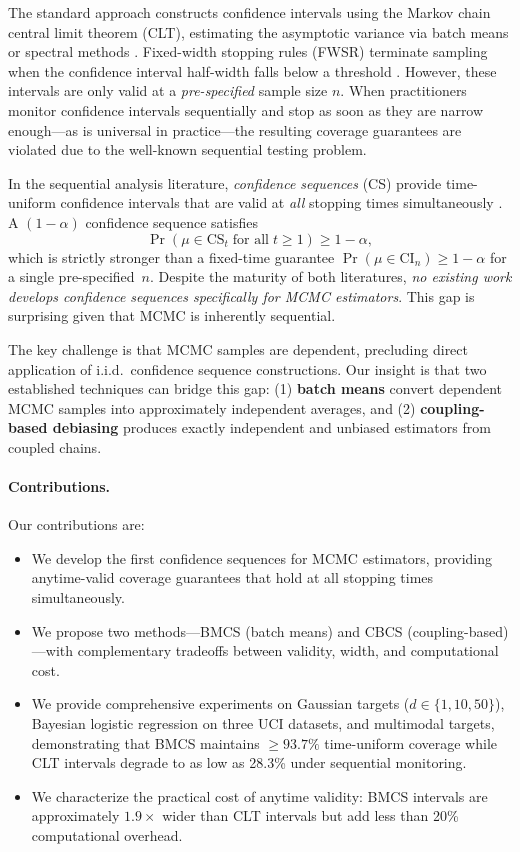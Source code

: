 \documentclass[11pt]{article}
\newcommand{\CS}{\mathrm{CS}}
\newcommand{\CI}{\mathrm{CI}}
\begin{document}
The standard approach constructs confidence intervals using the Markov chain central limit theorem (CLT), estimating the asymptotic variance via batch means or spectral methods \citep{flegal2010batch,vats2019multivariate}. Fixed-width stopping rules (FWSR) terminate sampling when the confidence interval half-width falls below a threshold \citep{vats2019multivariate,flegal2024implementing}. However, these intervals are only valid at a \emph{pre-specified} sample size $n$. When practitioners monitor confidence intervals sequentially and stop as soon as they are narrow enough---as is universal in practice---the resulting coverage guarantees are violated due to the well-known sequential testing problem.

In the sequential analysis literature, \emph{confidence sequences} (CS) provide time-uniform confidence intervals that are valid at \emph{all} stopping times simultaneously \citep{howard2021time,ramdas2023game}. A $(1-\alpha)$ confidence sequence satisfies
\begin{equation}
\Pr\!\left(\mu \in \CS_t \;\text{for all}\; t \geq 1\right) \geq 1 - \alpha,
\label{eq:cs_def}
\end{equation}
which is strictly stronger than a fixed-time guarantee $\Pr(\mu \in \CI_n) \geq 1-\alpha$ for a single pre-specified~$n$. Despite the maturity of both literatures, \emph{no existing work develops confidence sequences specifically for MCMC estimators}. This gap is surprising given that MCMC is inherently sequential.

The key challenge is that MCMC samples are dependent, precluding direct application of i.i.d.\ confidence sequence constructions. Our insight is that two established techniques can bridge this gap: (1) \textbf{batch means} convert dependent MCMC samples into approximately independent averages, and (2) \textbf{coupling-based debiasing} \citep{jacob2020unbiased} produces exactly independent and unbiased estimators from coupled chains.

\paragraph{Contributions.} Our contributions are:
\begin{itemize}
  \item We develop the first confidence sequences for MCMC estimators, providing anytime-valid coverage guarantees that hold at all stopping times simultaneously.
  \item We propose two methods---BMCS (batch means) and CBCS (coupling-based)---with complementary tradeoffs between validity, width, and computational cost.
  \item We provide comprehensive experiments on Gaussian targets ($d \in \{1, 10, 50\}$), Bayesian logistic regression on three UCI datasets, and multimodal targets, demonstrating that BMCS maintains $\geq 93.7\%$ time-uniform coverage while CLT intervals degrade to as low as 28.3\% under sequential monitoring.
  \item We characterize the practical cost of anytime validity: BMCS intervals are approximately $1.9\times$ wider than CLT intervals but add less than 20\% computational overhead.
\end{itemize}
\end{document}
